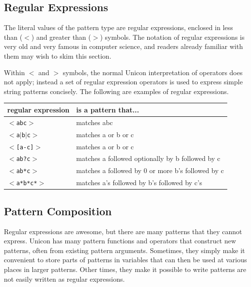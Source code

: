 \subsection{Regular Expressions}

The literal values of the pattern type are regular expressions,
enclosed in less than ($<$) and greater than ($>$) symbols. The
notation of regular expressions is very old and very famous in
computer science, and readers already familiar with them may wish
to skim this section.

Within $<$ and $>$ symbols, the normal Unicon interpretation of
operators does not apply; instead a set of regular expression
operators is used to express simple string patterns concisely.  The
following are examples of regular expressions.

\bigskip

\begin{tabular}{|l|l|} \hline
regular expression	& is a pattern that... \\ \hline
\texttt{$<$abc$>$}	& matches abc \\
\texttt{$<$a$|$b$|$c$>$}& matches a or b or c \\
\texttt{$<$[a-c]$>$}	& matches a or b or c \\
\texttt{$<$ab?c$>$}	& matches a followed optionally by b followed by c \\
\texttt{$<$ab*c$>$}	& matches a followed by 0 or more b's followed by c \\
\texttt{$<$a*b*c*$>$}	& matches a's followed by b's followed by c's \\ \hline
\end{tabular}

\subsection{Pattern Composition}

Regular expressions are awesome, but there are many patterns that they
cannot express. Unicon has many pattern functions and operators that
construct new patterns, often from existing pattern
arguments. Sometimes, they simply make it convenient to store parts of
patterns in variables that can then be used at various places in
larger patterns. Other times, they make it possible to write patterns
are not easily written as regular expressions.

